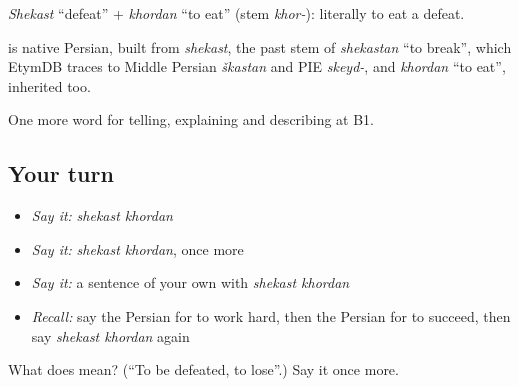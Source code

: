 \emph{Shekast} \textquotedblleft{}defeat\textquotedblright{} + \emph{khordan} \textquotedblleft{}to eat\textquotedblright{} (stem \emph{khor-}): literally to eat a defeat.

\begin{cousinweb}
\textbf{ } is native Persian, built from \emph{shekast}, the past stem of \emph{shekastan} \textquotedblleft{}to break\textquotedblright{}, which EtymDB traces to Middle Persian \emph{škastan} and PIE \emph{skeyd-}, and \emph{khordan} \textquotedblleft{}to eat\textquotedblright{}, inherited too.
\end{cousinweb}

\begin{grammarlens}[title={What you've built}]
One more word for telling, explaining and describing at B1.
\end{grammarlens}

\subsection*{Your turn}
\begin{itemize}
\raggedright
  \item \emph{Say it:} \emph{shekast khordan}
  \item \emph{Say it:} \emph{shekast khordan}, once more
  \item \emph{Say it:} a sentence of your own with \emph{shekast khordan}
  \item \emph{Recall:} say the Persian for to work hard, then the Persian for to succeed, then say \emph{shekast khordan} again
\end{itemize}

\begin{tcolorbox}[breakable,colback=teal!4,colframe=teal!35!black,title={Before you move on}]
What does   mean? (\textquotedblleft{}To be defeated, to lose\textquotedblright{}.) Say it once more.
\end{tcolorbox}
